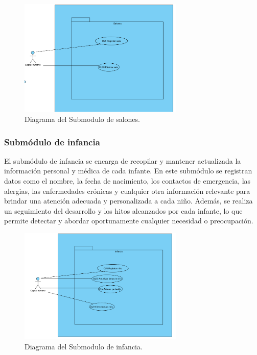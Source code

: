 \begin{figure}[htbp]
\centering
\includegraphics[width=0.7\textwidth]{images/arqui/subSisGestInfantSalon.png}
\caption{Diagrama del Submodulo de salones.}
\label{fig:subsistGestionInfansalones}
\end{figure}

\subsubsection{Submódulo de infancia}
El submódulo de infancia se encarga de recopilar y mantener actualizada la información personal y médica de cada infante. En este submódulo se registran datos como el nombre, la fecha de nacimiento, los contactos de emergencia, las alergias, las enfermedades crónicas y cualquier otra información relevante para brindar una atención adecuada y personalizada a cada niño. Además, se realiza un seguimiento del desarrollo y los hitos alcanzados por cada infante, lo que permite detectar y abordar oportunamente cualquier necesidad o preocupación.

\begin{figure}[htbp]
\centering
\includegraphics[width=0.7\textwidth]{images/arqui/subSisGestInfantInfancia.png}
\caption{Diagrama del Submodulo de infancia.}
\label{fig:subsistGestionInfanInfancia}
\end{figure}



